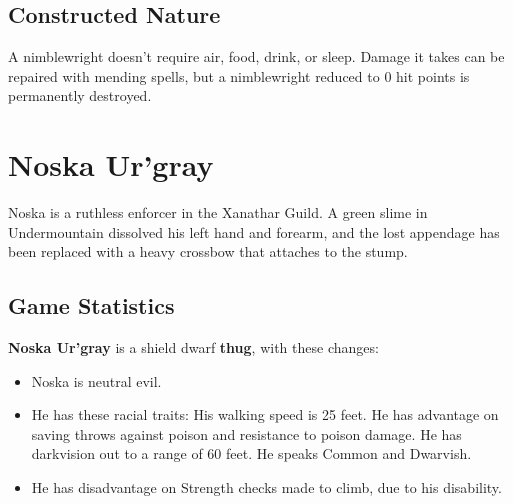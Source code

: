 \documentclass[10pt,a4paper,twoside,twocolumn,openany,nodeprecatedcode]{dndbook}
\begin{document}
\subsection{Constructed Nature}
A nimblewright doesn't require air, food, drink, or sleep. Damage it takes can be repaired with mending spells, but a nimblewright reduced to 0 hit points is permanently destroyed.
\section{Noska Ur'gray}
Noska is a ruthless enforcer in the Xanathar Guild. A green slime in Undermountain dissolved his left hand and forearm, and the lost appendage has been replaced with a heavy crossbow that attaches to the stump.
\subsection{Game Statistics}
\textbf{Noska Ur'gray} is a shield dwarf \textbf{thug}, with these changes:
\begin{itemize}

\item Noska is neutral evil.
\item He has these racial traits: His walking speed is 25 feet. He has advantage on saving throws against poison and resistance to poison damage. He has darkvision out to a range of 60 feet. He speaks Common and Dwarvish.
\item He has disadvantage on Strength checks made to climb, due to his disability.
\end{itemize}
\end{document}
